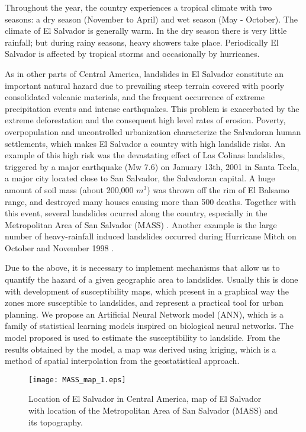 \documentclass[11pt,twoside]{rmta2010eng}%
\begin{document}
Throughout the year, the country experiences a tropical climate with two seasons: a dry season (November to April) and wet season (May - October). The climate of El Salvador is generally warm. In the dry season there is very little rainfall; but during rainy seasons, heavy showers take place. Periodically El Salvador is affected by tropical storms and occasionally by hurricanes.

As in other parts of Central America, landslides in El Salvador constitute an important natural hazard due to prevailing steep terrain covered with poorly consolidated volcanic materials, and the frequent occurrence of extreme precipitation events and intense earthquakes. This problem is exacerbated by the extreme deforestation and the consequent high level rates of erosion. Poverty, overpopulation and uncontrolled urbanization characterize the Salvadoran human settlements, which makes El Salvador a country with high landslide risks. An example of this high risk was the devastating effect of Las Colinas landslides,  triggered by a major earthquake (Mw 7.6) on January 13th, 2001 in Santa Tecla, a major city located close to San Salvador, the Salvadoran capital\cite{evans}. A huge amount of soil mass (about 200,000 $m^{3}$) was thrown off the rim of El Balsamo range, and destroyed many houses causing more than 500 deaths. Together with this event, several landslides ocurred along the country, especially in the Metropolitan Area of San Salvador (MASS) \cite{jibson}. Another example is the large number of heavy-rainfall induced landslides occurred during Hurricane Mitch on October and November 1998 \cite{crone}.   

Due to the above, it is necessary to implement mechanisms that allow us to quantify the hazard of a given geographic area to landslides. Usually this is done with development of susceptibility maps, which present in a graphical way the zones more susceptible to landslides, and represent a practical tool for urban planning. We propose an Artificial Neural Network model (ANN), which is a family of statistical learning models inspired on biological neural networks. The model proposed is used to estimate the susceptibility to landslide. From the results obtained by the model, a map was derived using kriging, which is a method of spatial interpolation from the geostatistical approach. 


 \begin{center}
  \begin{figure}
   \centering
   \texttt{[image: MASS\_map\_1.eps]}
   \caption{\small{Location of El Salvador in Central America, map of El Salvador with location of the Metropolitan Area of San Salvador (MASS) and its topography.}}
   \label{fig:mass01}
  \end{figure}
 \end{center}
\end{document}
